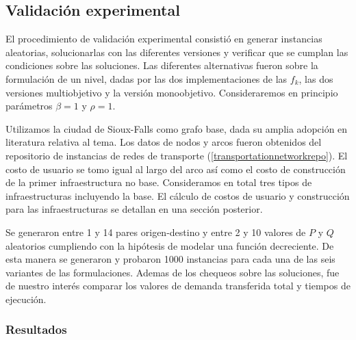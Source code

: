 \documentclass{article}
\begin{document}
  \FloatBarrier
  \subsection{Validación experimental}

  El procedimiento de validación experimental consistió en generar instancias aleatorias, solucionarlas con las diferentes versiones y verificar que se cumplan las condiciones sobre las soluciones. Las diferentes alternativas fueron sobre la formulación de un nivel, dadas por las dos implementaciones de las $f_k$, las dos versiones multiobjetivo y la versión monoobjetivo. Consideraremos en principio parámetros $\beta = 1$ y $\rho = 1$.

  Utilizamos la ciudad de Sioux-Falls como grafo base, dada su amplia adopción en literatura relativa al tema. Los datos de nodos y arcos fueron obtenidos del repositorio de instancias de redes de transporte (\ref{transportationnetworkrepo}). El costo de usuario se tomo igual al largo del arco así como el costo de construcción de la primer infraestructura no base. Consideramos en total tres tipos de infraestructuras incluyendo la base. El cálculo de costos de usuario y construcción para las infraestructuras se detallan en una sección posterior.

  Se generaron entre 1 y 14 pares origen-destino y entre 2 y 10 valores de $P$ y $Q$ aleatorios cumpliendo con la hipótesis de modelar una función decreciente.
  De esta manera se generaron y probaron 1000 instancias para cada una de las seis variantes de las formulaciones. Ademas de los chequeos sobre las soluciones, fue de nuestro interés comparar los valores de demanda transferida total y tiempos de ejecución.

  \FloatBarrier
  \subsubsection{Resultados}
\end{document}
